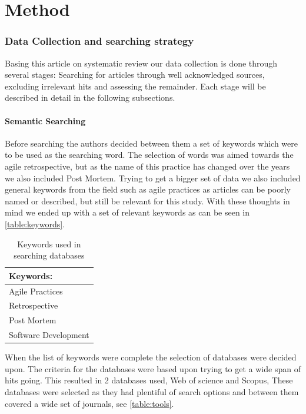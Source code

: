 \documentclass[12pt]{article}
\begin{document}
\clearpage

\part{Method}

\section{Data Collection and searching strategy}
Basing this article on systematic review our data collection is done through several stages: Searching for articles through well acknowledged sources, excluding irrelevant hits and assessing the remainder. Each stage will be described in detail in the following subsections.

\subsection{Semantic Searching}
Before searching the authors decided between them a set of keywords which were to be used as the searching word. The selection of words was aimed towards the agile retrospective, but as the name of this practice has changed over the years we also included Post Mortem. Trying to get a bigger set of data we also included general keywords from the field such as agile practices as articles can be poorly named or described, but still be relevant for this study. With these thoughts in mind we ended up with a set of relevant keywords as can be seen in \autoref{table:keywords}.

\begin{table}[!h]
	\begin{center}
		\caption{Keywords used in searching databases}
		\label{table:keywords}
		\begin{tabular}{ l }
			Keywords: \\ \hline
			Agile Practices \\
			Retrospective \\
			Post Mortem \\
			Software Development \\
		\end{tabular}
	\end{center}
\end{table}

When the list of keywords were complete the selection of databases were decided upon. The criteria for the databases were based upon trying to get a wide span of hits going. This resulted in 2 databases used, Web of science and Scopus, These databases were selected as they had plentiful of search options and between them covered a wide set of journals, see \autoref{table:tools}. 
\end{document}

